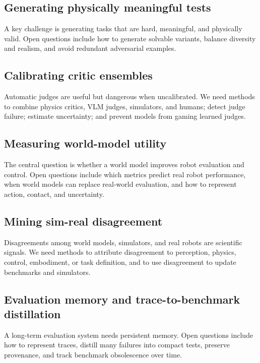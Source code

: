 \documentclass[sigconf,review,anonymous]{acmart}
\begin{document}
\subsection{Generating physically meaningful tests}

A key challenge is generating tasks that are hard, meaningful, and physically valid. Open questions include how to generate solvable variants, balance diversity and realism, and avoid redundant adversarial examples.

\subsection{Calibrating critic ensembles}

Automatic judges are useful but dangerous when uncalibrated. We need methods to combine physics critics, VLM judges, simulators, and humans; detect judge failure; estimate uncertainty; and prevent models from gaming learned judges.

\subsection{Measuring world-model utility}

The central question is whether a world model improves robot evaluation and control. Open questions include which metrics predict real robot performance, when world models can replace real-world evaluation, and how to represent action, contact, and uncertainty.

\subsection{Mining sim-real disagreement}

Disagreements among world models, simulators, and real robots are scientific signals. We need methods to attribute disagreement to perception, physics, control, embodiment, or task definition, and to use disagreement to update benchmarks and simulators.

\subsection{Evaluation memory and trace-to-benchmark distillation}

A long-term evaluation system needs persistent memory. Open questions include how to represent traces, distill many failures into compact tests, preserve provenance, and track benchmark obsolescence over time.
\end{document}

